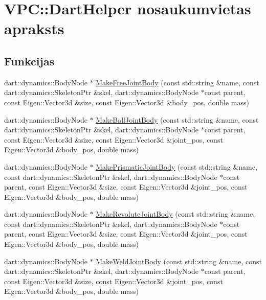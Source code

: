 \hypertarget{namespace_v_p_c_1_1_dart_helper}{}\section{V\+PC\+:\+:Dart\+Helper nosaukumvietas apraksts}
\label{namespace_v_p_c_1_1_dart_helper}
\subsection*{Funkcijas}
\begin{DoxyCompactItemize}
\item 
dart\+::dynamics\+::\+Body\+Node $\ast$ \hyperlink{namespace_v_p_c_1_1_dart_helper_a69fa7c63ad96f84bb86411e438a73d48}{Make\+Free\+Joint\+Body} (const std\+::string \&name, const dart\+::dynamics\+::\+Skeleton\+Ptr \&skel, dart\+::dynamics\+::\+Body\+Node $\ast$const parent, const Eigen\+::\+Vector3d \&size, const Eigen\+::\+Vector3d \&body\+\_\+pos, double mass)
\item 
dart\+::dynamics\+::\+Body\+Node $\ast$ \hyperlink{namespace_v_p_c_1_1_dart_helper_ae6733c6d54ab191ffd40b2bc0e013d05}{Make\+Ball\+Joint\+Body} (const std\+::string \&name, const dart\+::dynamics\+::\+Skeleton\+Ptr \&skel, dart\+::dynamics\+::\+Body\+Node $\ast$const parent, const Eigen\+::\+Vector3d \&size, const Eigen\+::\+Vector3d \&joint\+\_\+pos, const Eigen\+::\+Vector3d \&body\+\_\+pos, double mass)
\item 
dart\+::dynamics\+::\+Body\+Node $\ast$ \hyperlink{namespace_v_p_c_1_1_dart_helper_aca1fb6a9cadd2f260f0e20813d2c6c57}{Make\+Prismatic\+Joint\+Body} (const std\+::string \&name, const dart\+::dynamics\+::\+Skeleton\+Ptr \&skel, dart\+::dynamics\+::\+Body\+Node $\ast$const parent, const Eigen\+::\+Vector3d \&size, const Eigen\+::\+Vector3d \&joint\+\_\+pos, const Eigen\+::\+Vector3d \&body\+\_\+pos, double mass)
\item 
dart\+::dynamics\+::\+Body\+Node $\ast$ \hyperlink{namespace_v_p_c_1_1_dart_helper_a4cf2225ca4d44189f0f0f390cf7aff99}{Make\+Revolute\+Joint\+Body} (const std\+::string \&name, const dart\+::dynamics\+::\+Skeleton\+Ptr \&skel, dart\+::dynamics\+::\+Body\+Node $\ast$const parent, const Eigen\+::\+Vector3d \&size, const Eigen\+::\+Vector3d \&joint\+\_\+pos, const Eigen\+::\+Vector3d \&body\+\_\+pos, double mass)
\item 
dart\+::dynamics\+::\+Body\+Node $\ast$ \hyperlink{namespace_v_p_c_1_1_dart_helper_a70dd049386ce8ba7d9fdb96407d8c3d3}{Make\+Weld\+Joint\+Body} (const std\+::string \&name, const dart\+::dynamics\+::\+Skeleton\+Ptr \&skel, dart\+::dynamics\+::\+Body\+Node $\ast$const parent, const Eigen\+::\+Vector3d \&size, const Eigen\+::\+Vector3d \&joint\+\_\+pos, const Eigen\+::\+Vector3d \&body\+\_\+pos, double mass)
\end{DoxyCompactItemize}


